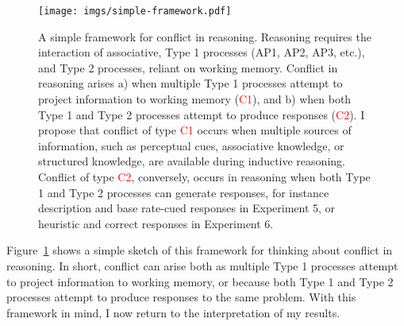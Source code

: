 \begin{figure}[ht]
  \centering
  \texttt{[image: imgs/simple-framework.pdf]}
  \caption[A framework for conflict in reasoning]{
    \label{fig:conflict-framework}
    A simple framework for conflict in reasoning.
    Reasoning requires the interaction of
    associative, Type 1 processes (AP1, AP2, AP3, etc.),
    and Type 2 processes, reliant on working memory.
    Conflict in reasoning arises
    a) when multiple Type 1 processes
    attempt to project information to working memory
    (\textcolor{red}{C1}), and
    b) when both Type 1 
    and Type 2 processes attempt to produce responses
    (\textcolor{red}{C2}).
    I propose that conflict of type \textcolor{red}{C1} occurs
    when multiple sources of information,
    such as perceptual cues, associative knowledge, or structured knowledge,
    are available during inductive reasoning.
    Conflict of type \textcolor{red}{C2}, conversely,
    occurs in reasoning when both Type 1 and Type 2 processes
    can generate responses, for instance description
    and base rate-cued responses in Experiment 5,
    or heuristic and correct responses in Experiment 6.
  }
\end{figure}

Figure~\ref{fig:conflict-framework} shows a simple sketch of
this framework for thinking about conflict in reasoning.
In short, conflict can arise both
as multiple Type 1 processes attempt to project information to working memory,
or because both Type 1 and Type 2 processes
attempt to produce responses to the same problem.
With this framework in mind, I now return to the interpretation of my results.
